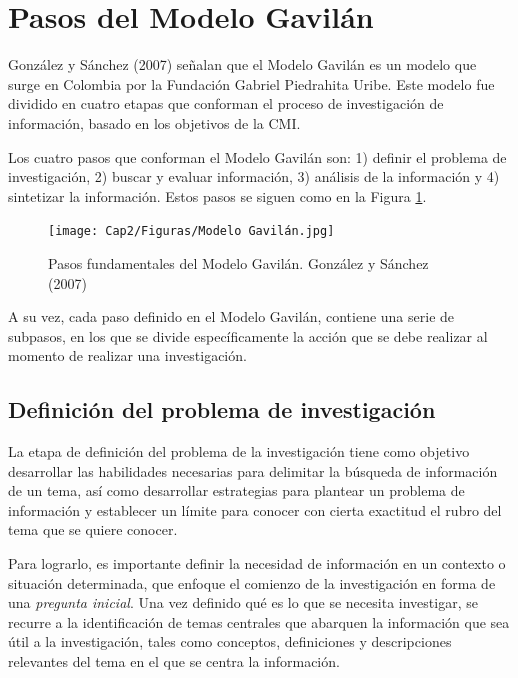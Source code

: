 \section{Pasos del Modelo Gavilán}
\label{secPasosCap2}

González y Sánchez (2007) señalan que el Modelo Gavilán es un modelo que surge en Colombia por la Fundación Gabriel Piedrahita Uribe. Este modelo fue dividido en cuatro etapas que conforman el proceso de investigación de información, basado en los objetivos de la CMI.

Los cuatro pasos que conforman el Modelo Gavilán son: 1) definir el problema de investigación, 2) buscar y evaluar información, 3) análisis de la información y 4) sintetizar la información. Estos pasos se siguen como en la Figura \ref{fig:22}.

\begin{figure}[H]
  \centering
  \texttt{[image: Cap2/Figuras/Modelo Gavilán.jpg]}
  \caption{Pasos fundamentales del Modelo Gavilán. González y Sánchez (2007)}
  \label{fig:22}
\end{figure}

A su vez, cada paso definido en el Modelo Gavilán, contiene una serie de subpasos, en los que se divide específicamente la acción que se debe realizar al momento de realizar una investigación.


\subsection{Definición del problema de investigación}
\label{secPaso1Cap2}

La etapa de definición del problema de la investigación tiene como objetivo desarrollar las habilidades necesarias para delimitar la búsqueda de información de un tema, así como desarrollar estrategias para plantear un problema de información y establecer un límite para conocer con cierta exactitud el rubro del tema que se quiere conocer.

Para lograrlo, es importante definir la necesidad de información en un contexto o situación determinada, que enfoque el comienzo de la investigación en forma de una \textit{pregunta inicial}. Una vez definido qué es lo que se necesita investigar, se recurre a la identificación de temas centrales que abarquen la información que sea útil a la investigación, tales como conceptos, definiciones y descripciones relevantes del tema en el que se centra la información.

